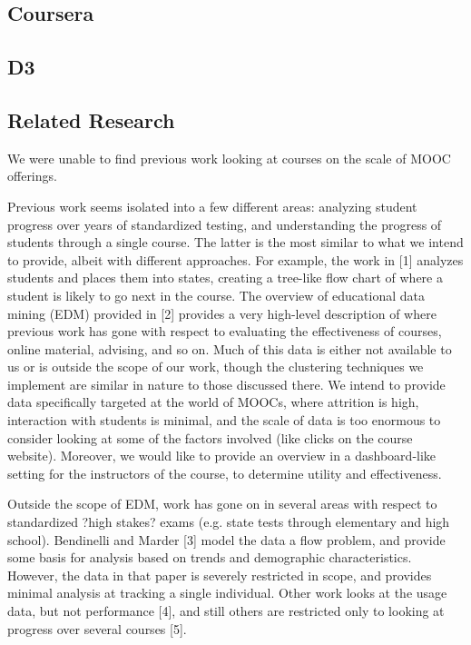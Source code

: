 
\subsection{Coursera}

\subsection{D3}

\subsection{Related Research}
We were unable to find previous work looking at courses on the scale of MOOC offerings. 

Previous work seems isolated into a few different areas: analyzing student progress over years of standardized testing, and understanding the progress of students through a single course. The latter is the most similar to what we intend to provide, albeit with different approaches. For example, the work in [1] analyzes students and places them into states, creating a tree-like flow chart of where a student is likely to go next in the course. The overview of educational data mining (EDM) provided in [2] provides a very high-level description of where previous work has gone with respect to evaluating the effectiveness of courses, online material, advising, and so on. Much of this data is either not available to us or is outside the scope of our work, though the clustering techniques we implement are similar in nature to those discussed there. We intend to provide data specifically targeted at the world of MOOCs, where attrition is high, interaction with students is minimal, and the scale of data is too enormous to consider looking at some of the factors involved (like clicks on the course website). Moreover, we would like to provide an overview in a dashboard-like setting for the instructors of the course, to determine utility and effectiveness. 

Outside the scope of EDM, work has gone on in several areas with respect to standardized ?high stakes? exams (e.g. state tests through elementary and high school). Bendinelli and Marder [3] model the data a flow problem, and provide some basis for analysis based on trends and demographic characteristics. However, the data in that paper is severely restricted in scope, and provides minimal analysis at tracking a single individual. Other work looks at the usage data, but not performance [4], and still others are restricted only to looking at progress over several courses [5].

